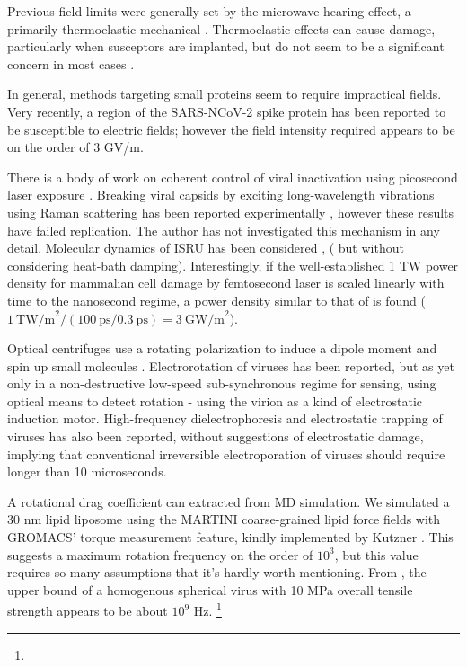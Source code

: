 \documentclass[paper.tex]{subfiles}
\begin{document}
\begin{multicols}{1}
Previous field limits were generally set by the microwave hearing effect, a primarily thermoelastic mechanical \cite{MICROWAVEINDUCED1975}. Thermoelastic effects can cause damage\cite{MECHANICAL1968}, particularly when susceptors are implanted\cite{Thermoacoustic2017}, but do not seem to be a significant concern in most cases \cite{Radiation1996}.

In general, methods targeting small proteins seem to require impractical fields\cite{Picosecond2016b}. Very recently, a region of the SARS-NCoV-2 spike protein has been reported to be susceptible to electric fields\cite{Receptor2021}; however the field intensity required appears to be on the order of 3 GV/m.

There is a body of work on coherent control of viral inactivation using picosecond laser exposure \cite{Maximum2010}. Breaking viral capsids by exciting long-wavelength vibrations using Raman scattering has been reported experimentally \cite{Inactivation2007}\cite{Prospects2012}\cite{Studies2014}, however these results have failed replication\cite{No2011}. The author has not investigated this mechanism in any detail. Molecular dynamics of ISRU has been considered \cite{Maximum2010}, (\cite{Vibrational2009} but without considering heat-bath damping). Interestingly, if the well-established 1 TW power density\cite{Targeted2002} for mammalian cell damage by femtosecond laser is scaled linearly with time to the nanosecond regime, a power density similar to that of \cite{Repeated2020} is found ($1\ \text{TW/m}^2 / (100\ \text{ps} / 0.3\ \text{ps}) = 3\ \text{GW/m}^2$). 

Optical centrifuges use a rotating polarization to induce a dipole moment and spin up small molecules \cite{Forced2000}\cite{Spinning2000}. Electrorotation\cite{RotatingFieldInduced1982}\cite{Electrorotation1988}\cite{Electrorotation1997}\cite{Dielectric1988} of viruses has been reported\cite{Analysis2004}\cite{New1999}\cite{comprehensive2001}, but as yet only in a non-destructive low-speed sub-synchronous regime for sensing, using optical means to detect rotation - using the virion as a kind of electrostatic induction motor. High-frequency dielectrophoresis and electrostatic trapping of viruses has also been reported\cite{Accumulation2006}, without suggestions of electrostatic damage, implying that conventional irreversible electroporation of viruses should require longer than 10 microseconds.

A rotational drag coefficient can extracted from MD simulation\cite{Evaluating2017}. We simulated a 30 nm lipid liposome using the MARTINI coarse-grained \cite{MARTINI2007}\cite{BUMPy2018}\cite{Tsjerk2020} lipid force fields with GROMACS\cite{GROMACS2005}' torque measurement feature, kindly implemented by Kutzner \cite{Keep2011}. This suggests a maximum rotation frequency on the order of $10^3$, but this value requires so many assumptions that it's hardly worth mentioning. From \cite{Spinning2008}, the upper bound of a homogenous spherical virus with 10 MPa overall tensile strength appears to be about $10^9$ Hz. \footnote{} 




\end{multicols}
\end{document}
